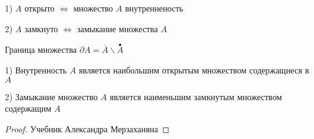 \begin{block}[Следствие]
  1) $A$ открыто $\Leftrightarrow$ множество $A$ внутренненость

  2) $A$ замкнуто $\Leftrightarrow$ замыкание множества $A$
\end{block}

\begin{define}
  Граница множества $\partial A = \overline{A} \backslash \stackrel{\bullet}{A}$
\end{define}

\begin{theorem}
  1) Внутренность $A$ является наибольшим открытым множеством
  содержащиеся в $A$

  2) Замыкание множество $A$ является наименьшим замкнутым множеством
  содержащим $A$
\end{theorem}

\begin{proof}
  Учебник Александра Мерзаханяна
\end{proof}
